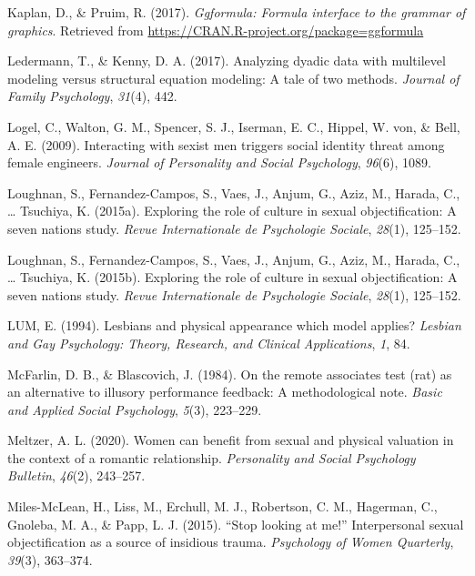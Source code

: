 \documentclass[
  man]{apa6}
\begin{document}
\leavevmode\hypertarget{ref-R-ggformula}{}%
Kaplan, D., \& Pruim, R. (2017). \emph{Ggformula: Formula interface to the grammar of graphics}. Retrieved from \url{https://CRAN.R-project.org/package=ggformula}

\leavevmode\hypertarget{ref-ledermann2017analyzing}{}%
Ledermann, T., \& Kenny, D. A. (2017). Analyzing dyadic data with multilevel modeling versus structural equation modeling: A tale of two methods. \emph{Journal of Family Psychology}, \emph{31}(4), 442.

\leavevmode\hypertarget{ref-logel2009interacting}{}%
Logel, C., Walton, G. M., Spencer, S. J., Iserman, E. C., Hippel, W. von, \& Bell, A. E. (2009). Interacting with sexist men triggers social identity threat among female engineers. \emph{Journal of Personality and Social Psychology}, \emph{96}(6), 1089.

\leavevmode\hypertarget{ref-loughnan2015exploring}{}%
Loughnan, S., Fernandez-Campos, S., Vaes, J., Anjum, G., Aziz, M., Harada, C., \ldots{} Tsuchiya, K. (2015a). Exploring the role of culture in sexual objectification: A seven nations study. \emph{Revue Internationale de Psychologie Sociale}, \emph{28}(1), 125--152.

\leavevmode\hypertarget{ref-loughnan2015}{}%
Loughnan, S., Fernandez-Campos, S., Vaes, J., Anjum, G., Aziz, M., Harada, C., \ldots{} Tsuchiya, K. (2015b). Exploring the role of culture in sexual objectification: A seven nations study. \emph{Revue Internationale de Psychologie Sociale}, \emph{28}(1), 125--152.

\leavevmode\hypertarget{ref-lum1994lesbians}{}%
LUM, E. (1994). Lesbians and physical appearance which model applies? \emph{Lesbian and Gay Psychology: Theory, Research, and Clinical Applications}, \emph{1}, 84.

\leavevmode\hypertarget{ref-mcfarlin1984remote}{}%
McFarlin, D. B., \& Blascovich, J. (1984). On the remote associates test (rat) as an alternative to illusory performance feedback: A methodological note. \emph{Basic and Applied Social Psychology}, \emph{5}(3), 223--229.

\leavevmode\hypertarget{ref-meltzer2020women}{}%
Meltzer, A. L. (2020). Women can benefit from sexual and physical valuation in the context of a romantic relationship. \emph{Personality and Social Psychology Bulletin}, \emph{46}(2), 243--257.

\leavevmode\hypertarget{ref-miles2015stop}{}%
Miles-McLean, H., Liss, M., Erchull, M. J., Robertson, C. M., Hagerman, C., Gnoleba, M. A., \& Papp, L. J. (2015). ``Stop looking at me!'' Interpersonal sexual objectification as a source of insidious trauma. \emph{Psychology of Women Quarterly}, \emph{39}(3), 363--374.
\end{document}
